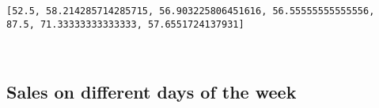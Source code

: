 \documentclass[11pt]{article}
\begin{document}
    \begin{Verbatim}[commandchars=\\\{\}]
[52.5, 58.214285714285715, 56.903225806451616, 56.55555555555556, 87.5, 71.33333333333333, 57.6551724137931]

    \end{Verbatim}

    \begin{center}
    \end{center}
    { \hspace*{\fill} \\}
    
    \hypertarget{sales-on-different-days-of-the-week}{%
\subsection{Sales on different days of the
week}\label{sales-on-different-days-of-the-week}}
\end{document}
